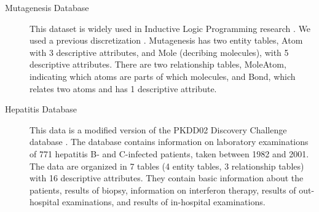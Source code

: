 \documentclass[runningheads,a4paper]{llncs}
\begin{document}
\begin{description}
\item[Mutagenesis Database] This dataset is widely used in Inductive Logic Programming research \cite{Srinivasan1996}. %
We used a previous discretization \cite{Schulte2012}.
Mutagenesis has two entity tables, Atom with 3 descriptive attributes, and Mole (decribing molecules), with 5 descriptive attributes. 
There are two relationship tables, MoleAtom, indicating which atoms are parts of which molecules, and Bond, which relates two atoms and has 1 descriptive attribute. 

\item[Hepatitis Database] This data is a modified version of the PKDD02 Discovery Challenge database \cite{Frank2007}. %
The database contains information on laboratory examinations of 771 hepatitis B- and C-infected patients, taken
between 1982 and 2001. The data are organized in 7 tables (4 entity tables,  3 relationship tables) with 16 descriptive attributes. They contain basic information about the patients, results of biopsy, information on interferon therapy, results of out-hospital examinations, and results of in-hospital examinations. 


\end{description}
\end{document}
